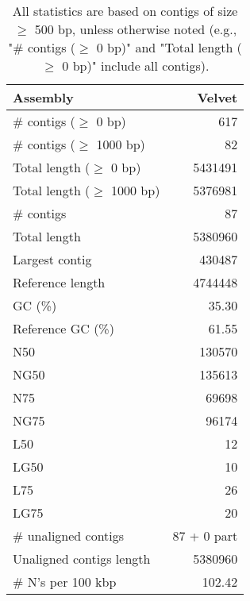 \documentclass[12pt,a4paper]{article}
\begin{document}
\begin{table}[ht]
\begin{center}
\caption{All statistics are based on contigs of size $\geq$ 500 bp, unless otherwise noted (e.g., "\# contigs ($\geq$ 0 bp)" and "Total length ($\geq$ 0 bp)" include all contigs).}
\begin{tabular}{|l*{1}{|r}|}
\hline
Assembly & Velvet \\ \hline
\# contigs ($\geq$ 0 bp) & 617 \\ \hline
\# contigs ($\geq$ 1000 bp) & 82 \\ \hline
Total length ($\geq$ 0 bp) & 5431491 \\ \hline
Total length ($\geq$ 1000 bp) & 5376981 \\ \hline
\# contigs & 87 \\ \hline
Total length & 5380960 \\ \hline
Largest contig & 430487 \\ \hline
Reference length & 4744448 \\ \hline
GC (\%) & 35.30 \\ \hline
Reference GC (\%) & 61.55 \\ \hline
N50 & 130570 \\ \hline
NG50 & 135613 \\ \hline
N75 & 69698 \\ \hline
NG75 & 96174 \\ \hline
L50 & 12 \\ \hline
LG50 & 10 \\ \hline
L75 & 26 \\ \hline
LG75 & 20 \\ \hline
\# unaligned contigs & 87 + 0 part \\ \hline
Unaligned contigs length & 5380960 \\ \hline
\# N's per 100 kbp & 102.42 \\ \hline
\end{tabular}
\end{center}
\end{table}
\end{document}
